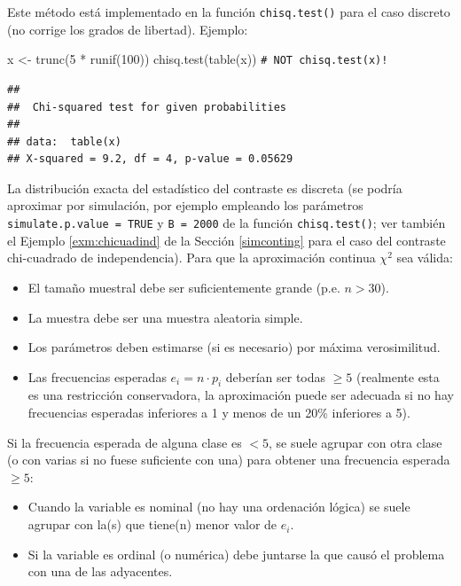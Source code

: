 \documentclass[
]{book}
\newenvironment{Shaded}{\begin{snugshade}}{\end{snugshade}}
\newcommand{\CommentTok}[1]{\textcolor[rgb]{0.56,0.35,0.01}{\textit{#1}}}
\newcommand{\DecValTok}[1]{\textcolor[rgb]{0.00,0.00,0.81}{#1}}
\newcommand{\FunctionTok}[1]{\textcolor[rgb]{0.00,0.00,0.00}{#1}}
\newcommand{\NormalTok}[1]{#1}
\newcommand{\OtherTok}[1]{\textcolor[rgb]{0.56,0.35,0.01}{#1}}
\newcommand{\SpecialCharTok}[1]{\textcolor[rgb]{0.00,0.00,0.00}{#1}}
\theoremstyle{break}
\theoremstyle{nonumberplain}
\renewcommand{\CommentTok}[1]{\textcolor[rgb]{0.41,0.41,0.41}{\texttt{#1}}}
\begin{document}
Este método está implementado en la función \texttt{chisq.test()} para el caso discreto (no corrige los grados de libertad).
Ejemplo:

\begin{Shaded}
\begin{Highlighting}[]
\NormalTok{x }\OtherTok{\textless{}{-}} \FunctionTok{trunc}\NormalTok{(}\DecValTok{5} \SpecialCharTok{*} \FunctionTok{runif}\NormalTok{(}\DecValTok{100}\NormalTok{))}
\FunctionTok{chisq.test}\NormalTok{(}\FunctionTok{table}\NormalTok{(x))            }\CommentTok{\# NOT \textquotesingle{}chisq.test(x)\textquotesingle{}!}
\end{Highlighting}
\end{Shaded}

\begin{verbatim}
## 
##  Chi-squared test for given probabilities
## 
## data:  table(x)
## X-squared = 9.2, df = 4, p-value = 0.05629
\end{verbatim}

La distribución exacta del estadístico del contraste es discreta (se podría aproximar por simulación, por ejemplo empleando los parámetros \texttt{simulate.p.value\ =\ TRUE} y \texttt{B\ =\ 2000} de la función \texttt{chisq.test()}; ver también el Ejemplo \ref{exm:chicuadind} de la Sección \ref{simconting} para el caso del contraste chi-cuadrado de independencia).
Para que la aproximación continua \(\chi^2\) sea válida:

\begin{itemize}
\item
  El tamaño muestral debe ser suficientemente grande (p.e. \(n>30\)).
\item
  La muestra debe ser una muestra aleatoria simple.
\item
  Los parámetros deben estimarse (si es necesario) por máxima
  verosimilitud.
\item
  Las frecuencias esperadas \(e_{i}=n\cdot p_{i}\) deberían ser todas
  \(\geq5\) (realmente esta es una restricción conservadora, la aproximación
  puede ser adecuada si no hay frecuencias esperadas inferiores a 1 y
  menos de un 20\% inferiores a 5).
\end{itemize}

Si la frecuencia esperada de alguna clase es \(<5\), se suele agrupar con otra
clase (o con varias si no fuese suficiente con una) para obtener una
frecuencia esperada \(\geq5\):

\begin{itemize}
\item
  Cuando la variable es nominal (no hay una ordenación lógica) se
  suele agrupar con la(s) que tiene(n) menor valor de \(e_{i}\).
\item
  Si la variable es ordinal (o numérica) debe juntarse la que causó el
  problema con una de las adyacentes.
\end{itemize}
\end{document}
